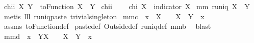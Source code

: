 \begin{isabellebody}
\isamarkupfalse%
\ {\isachardoublequoteopen}chii\ X\ Y\ {\isacharequal}{\isacharequal}\ toFunction\ {\isacharparenleft}X\ {\isacharless}{\isacharbar}{\isacharbar}\ Y{\isacharparenright}{\isachardoublequoteclose}\isanewline
{}\isamarkupfalse%
\ chii\ {\isacharparenleft}\ {\isachardoublequoteopen}{\isacharless}{\isacharbar}{\isachardoublequoteclose}\ {}{}{\isacharparenright}\isanewline
{}\isamarkupfalse%
\ {\isachardoublequoteopen}chi\ X\ {\isacharequal}{\isacharequal}\ indicator\ X{\isachardoublequoteclose}\isanewline
\isanewline
{}\isamarkupfalse%
\ mm{}{}{\isacharcolon}\ {\isachardoublequoteopen}runiq\ {\isacharparenleft}X\ {\isacharless}{\isacharbar}{\isacharbar}\ Y{\isacharparenright}{\isachardoublequoteclose}%
\isadelimproof
\ %
\endisadelimproof
%
\isatagproof
{}\isamarkupfalse%
\ {\isacharparenleft}metis\ lll{}{}\ runiq{\isacharunderscore}paste{}\ trivial{\isacharunderscore}singleton{\isacharparenright}%
\endisatagproof
{\isafoldproof}%
%
\isadelimproof
%
\endisadelimproof
\isanewline
\isanewline
{}\isamarkupfalse%
\ mm{}{}c{\isacharcolon}\ \ {\isachardoublequoteopen}x\ {\isasymin}\ X{\isachardoublequoteclose}\ \ {\isachardoublequoteopen}{}\ {\isasymin}\ {\isacharparenleft}X\ {\isacharless}{\isacharbar}{\isacharbar}\ Y{\isacharparenright}\ {\isacharbackquote}{\isacharbackquote}\ {\isacharbraceleft}x{\isacharbraceright}{\isachardoublequoteclose}%
\isadelimproof
\ %
\endisadelimproof
%
\isatagproof
{}\isamarkupfalse%
\ assms\ toFunction{\isacharunderscore}def\ \isanewline
paste{\isacharunderscore}def\ Outside{\isacharunderscore}def\ runiq{\isacharunderscore}def\ mm{}{}b\ \isamarkupfalse%
\ blast%
\endisatagproof
{\isafoldproof}%
%
\isadelimproof
%
\endisadelimproof
\isanewline
\isanewline
{}\isamarkupfalse%
\ mm{}{}d{\isacharcolon}\ \ {\isachardoublequoteopen}x\ {\isasymin}\ Y{\isacharminus}X{\isachardoublequoteclose}\ \ {\isachardoublequoteopen}{}\ {\isasymin}\ {\isacharparenleft}X\ {\isacharless}{\isacharbar}{\isacharbar}\ Y{\isacharparenright}\ {\isacharbackquote}{\isacharbackquote}\ {\isacharbraceleft}x{\isacharbraceright}{\isachardoublequoteclose}%
\isadelimproof
\ %
\endisadelimproof
%
\isatagproof
{}\isamarkupfalse%

\end{isabellebody}
